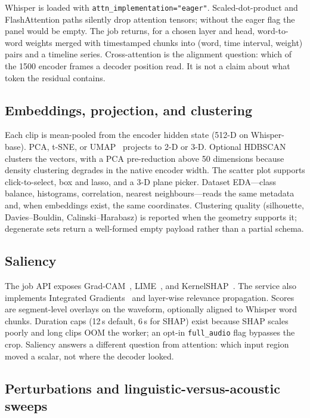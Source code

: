 \documentclass[conference]{IEEEtran}
\begin{document}
Whisper is loaded with \texttt{attn\_implementation="eager"}. Scaled-dot-product and FlashAttention paths silently drop attention tensors; without the eager flag the panel would be empty. The job returns, for a chosen layer and head, word-to-word weights merged with timestamped chunks into (word, time interval, weight) pairs and a timeline series. Cross-attention is the alignment question: which of the 1500 encoder frames a decoder position read. It is not a claim about what token the residual contains.

\subsection{Embeddings, projection, and clustering}

Each clip is mean-pooled from the encoder hidden state (512-D on Whisper-base). PCA, t-SNE, or UMAP~\cite{mcinnes2018umap} projects to 2-D or 3-D. Optional HDBSCAN~\cite{campello2013hdbscan} clusters the vectors, with a PCA pre-reduction above 50 dimensions because density clustering degrades in the native encoder width. The scatter plot supports click-to-select, box and lasso, and a 3-D plane picker. Dataset EDA---class balance, histograms, correlation, nearest neighbours---reads the same metadata and, when embeddings exist, the same coordinates. Clustering quality (silhouette, Davies--Bouldin, Calinski--Harabasz) is reported when the geometry supports it; degenerate sets return a well-formed empty payload rather than a partial schema.

\subsection{Saliency}

The job API exposes Grad-CAM~\cite{selvaraju2017gradcam}, LIME~\cite{ribeiro2016lime}, and KernelSHAP~\cite{lundberg2017shap}. The service also implements Integrated Gradients~\cite{sundararajan2017ig} and layer-wise relevance propagation. Scores are segment-level overlays on the waveform, optionally aligned to Whisper word chunks. Duration caps (12\,s default, 6\,s for SHAP) exist because SHAP scales poorly and long clips OOM the worker; an opt-in \texttt{full\_audio} flag bypasses the crop. Saliency answers a different question from attention: which input region moved a scalar, not where the decoder looked.

\subsection{Perturbations and linguistic-versus-acoustic sweeps}
\end{document}

